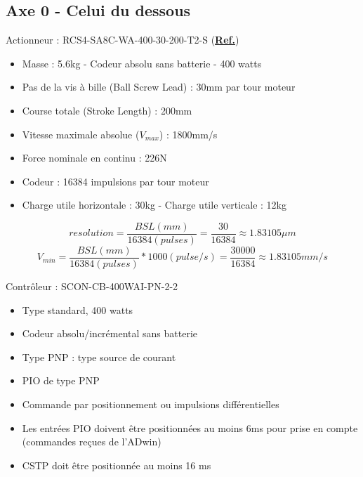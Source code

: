 \documentclass[a4paper,11pt]{beamer}
\begin{document}
\subsection{Axe 0 - Celui du dessous}
\begin{frame}

	\begin{block}{Actionneur : RCS4-SA8C-WA-400-30-200-T2-S (\textcolor{white}{\textbf{\underline{\href{https://raw.githubusercontent.com/fbuloup/Interface_IAI/main/Documentation/RCS4-SLIDER(ME3769-1H).pdf\#page=37}{Ref.}}}})}
		\begin{itemize}
			\item Masse : 5.6kg - Codeur absolu sans batterie - 400 watts
			\item Pas de la vis à bille (Ball Screw Lead) : 30mm par tour moteur
			\item Course totale (Stroke Length) : 200mm
			\item Vitesse maximale absolue ($V_{max}$) : 1800mm/s
			\item Force nominale en continu : 226N
			\item Codeur : 16384 impulsions par tour moteur
			\item Charge utile horizontale : 30kg - Charge utile verticale : 12kg
		\end{itemize}
	\end{block}
$$resolution=\frac{BSL(mm)}{16384(pulses)}=\frac{30}{16384}\approx 1.83105\mu m$$	
$$V_{min}=\frac{BSL(mm)}{16384(pulses)}*1000(pulse/s)=\frac{30000}{16384}\approx 1.83105mm/s$$
\end{frame}

\begin{frame}
\centering
	\begin{block}{Contrôleur : SCON-CB-400WAI-PN-2-2}
		\begin{itemize}
			\item Type standard, 400 watts
			\item Codeur absolu/incrémental sans batterie
			\item Type PNP : type source de courant
			\item PIO de type PNP
			\item Commande par positionnement ou impulsions différentielles
			\item Les entrées PIO doivent être positionnées au moins 6ms pour prise en compte (commandes reçues de l'ADwin)
			\item CSTP doit être positionnée au moins 16 
ms		\end{itemize}
	\end{block}
\end{frame}
\end{document}
